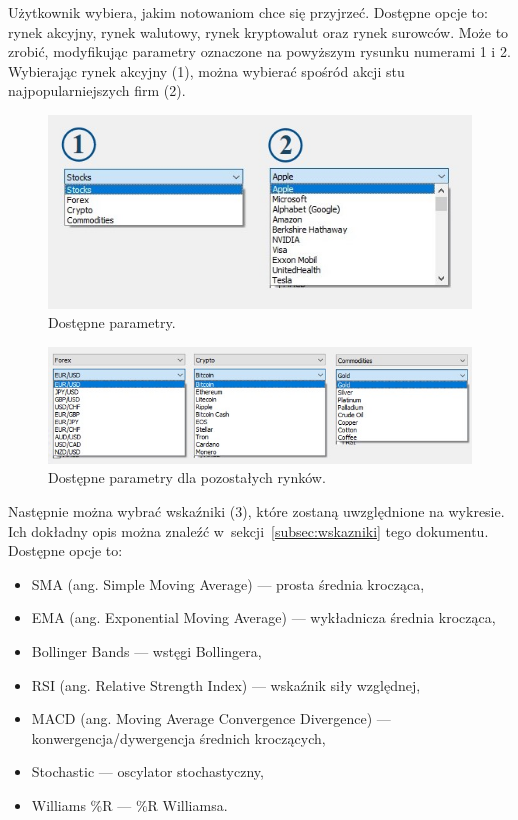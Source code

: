 \documentclass[12pt]{article}
\begin{document}
    Użytkownik wybiera, jakim notowaniom chce się przyjrzeć.
	Dostępne opcje to: rynek akcyjny, rynek walutowy, rynek kryptowalut oraz rynek surowców.
	Może to zrobić, modyfikując parametry oznaczone na powyższym rysunku numerami 1 i 2.
	Wybierając rynek akcyjny (1), można wybierać spośród akcji stu najpopularniejszych firm (2).

    \begin{figure}[H]
        \centering
        \includegraphics[scale=0.7]{pics/opcje_12}
        \caption{Dostępne parametry.}\label{fig:figure3}
	\end{figure}

    \begin{figure}[H]
        \centering
        \includegraphics[scale=0.7]{pics/forex_crypto_commodities}
        \caption{Dostępne parametry dla pozostałych rynków.}\label{fig:figure4}
	\end{figure}

    Następnie można wybrać wskaźniki (3), które zostaną uwzględnione na wykresie.
	Ich dokładny opis można znaleźć w~sekcji~\ref{subsec:wskazniki} tego dokumentu.
	Dostępne opcje to:

    \begin{itemize}
        \item SMA (ang. Simple Moving Average) — prosta średnia krocząca,
        \item EMA (ang. Exponential Moving Average) — wykładnicza średnia krocząca,
        \item Bollinger Bands — wstęgi Bollingera,
        \item RSI (ang. Relative Strength Index) — wskaźnik siły względnej,
        \item MACD (ang. Moving Average Convergence Divergence) — konwergencja/dywergencja średnich kroczących,
        \item Stochastic — oscylator stochastyczny,
        \item Williams \%R — \%R Williamsa.
    \end{itemize}
\end{document}
